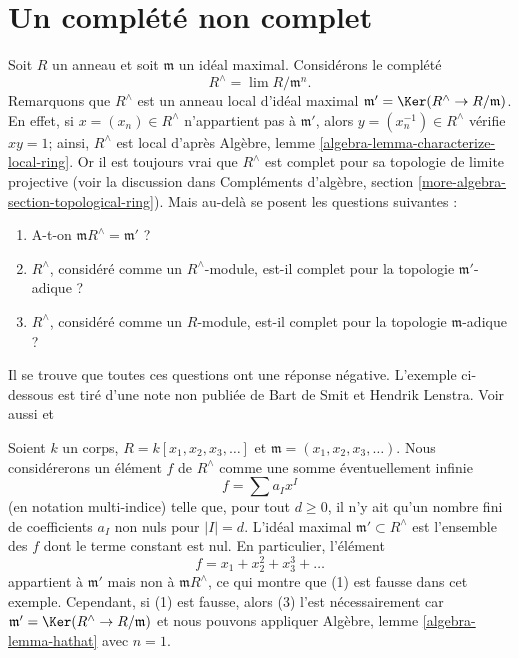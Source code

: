 \section{Un complété non complet}
\label{section-noncomplete-completion}

\noindent
Soit $R$ un anneau et soit $\mathfrak m$ un idéal maximal. Considérons le
complété
$$
R^\wedge = \lim R/\mathfrak m^n.
$$
Remarquons que $R^\wedge$ est un anneau local d'idéal maximal
$\mathfrak m' = \Ker(R^\wedge \to R/\mathfrak m)$.
En effet, si $x = (x_n) \in R^\wedge$ n'appartient pas à $\mathfrak m'$, alors
$y = (x_n^{-1}) \in R^\wedge$ vérifie $xy = 1$; ainsi, $R^\wedge$ est local d'après
Algèbre, lemme \ref{algebra-lemma-characterize-local-ring}. Or il est
toujours vrai que $R^\wedge$ est complet pour sa topologie de limite projective (voir la
discussion dans
Compléments d'algèbre, section \ref{more-algebra-section-topological-ring}).
Mais au-delà se posent les questions suivantes :
\begin{enumerate}
\item A-t-on $\mathfrak m R^\wedge = \mathfrak m'$ ?
\item $R^\wedge$, considéré comme un $R^\wedge$-module, est-il
complet pour la topologie $\mathfrak m'$-adique ?
\item $R^\wedge$, considéré comme un $R$-module, est-il complet pour la topologie $\mathfrak m$-adique ?
\end{enumerate}
Il se trouve que toutes ces questions ont une réponse négative.
L'exemple ci-dessous est tiré d'une note non publiée de
Bart de Smit et Hendrik Lenstra. Voir aussi
\cite[Exercise III.2.12]{Bourbaki-CA} et
\cite[Example 1.8]{Yekutieli}

\medskip\noindent
Soient $k$ un corps, $R = k[x_1, x_2, x_3, \ldots]$ et
$\mathfrak m = (x_1, x_2, x_3, \ldots)$.
Nous considérerons un élément $f$ de $R^\wedge$ comme une somme éventuellement infinie
$$
f = \sum a_I x^I
$$
(en notation multi-indice) telle que, pour tout $d \geq 0$, il
n'y ait qu'un nombre fini de coefficients $a_I$ non nuls pour $|I| = d$. L'idéal
maximal $\mathfrak m' \subset R^\wedge$ est l'ensemble des $f$ dont le
terme constant est nul. En particulier, l'élément
$$
f = x_1 + x_2^2 + x_3^3 + \ldots
$$
appartient à $\mathfrak m'$ mais non à $\mathfrak m R^\wedge$, ce qui
montre que (1) est fausse dans cet exemple. Cependant, si (1) est
fausse, alors (3) l'est nécessairement car
$\mathfrak m' = \Ker(R^\wedge \to R/\mathfrak m)$
et nous pouvons appliquer
Algèbre, lemme \ref{algebra-lemma-hathat} avec $n = 1$.

